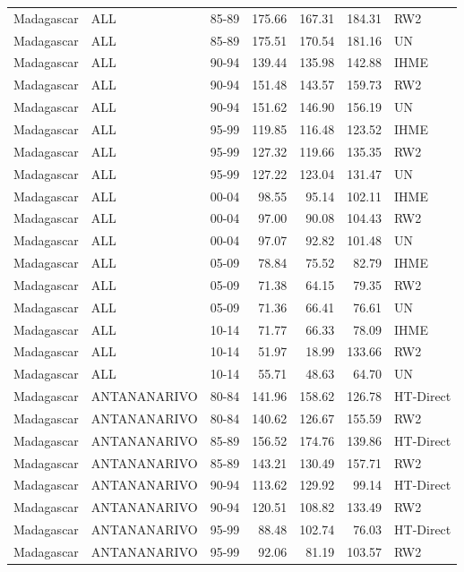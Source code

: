 \begin{longtable}{lllrrrl}
  Madagascar & ALL & 85-89 & 175.66 & 167.31 & 184.31 & RW2 \\ 
  Madagascar & ALL & 85-89 & 175.51 & 170.54 & 181.16 & UN \\ 
  Madagascar & ALL & 90-94 & 139.44 & 135.98 & 142.88 & IHME \\ 
  Madagascar & ALL & 90-94 & 151.48 & 143.57 & 159.73 & RW2 \\ 
  Madagascar & ALL & 90-94 & 151.62 & 146.90 & 156.19 & UN \\ 
  Madagascar & ALL & 95-99 & 119.85 & 116.48 & 123.52 & IHME \\ 
  Madagascar & ALL & 95-99 & 127.32 & 119.66 & 135.35 & RW2 \\ 
  Madagascar & ALL & 95-99 & 127.22 & 123.04 & 131.47 & UN \\ 
  Madagascar & ALL & 00-04 & 98.55 & 95.14 & 102.11 & IHME \\ 
  Madagascar & ALL & 00-04 & 97.00 & 90.08 & 104.43 & RW2 \\ 
  Madagascar & ALL & 00-04 & 97.07 & 92.82 & 101.48 & UN \\ 
  Madagascar & ALL & 05-09 & 78.84 & 75.52 & 82.79 & IHME \\ 
  Madagascar & ALL & 05-09 & 71.38 & 64.15 & 79.35 & RW2 \\ 
  Madagascar & ALL & 05-09 & 71.36 & 66.41 & 76.61 & UN \\ 
  Madagascar & ALL & 10-14 & 71.77 & 66.33 & 78.09 & IHME \\ 
  Madagascar & ALL & 10-14 & 51.97 & 18.99 & 133.66 & RW2 \\ 
  Madagascar & ALL & 10-14 & 55.71 & 48.63 & 64.70 & UN \\ 
  Madagascar & ANTANANARIVO & 80-84 & 141.96 & 158.62 & 126.78 & HT-Direct \\ 
  Madagascar & ANTANANARIVO & 80-84 & 140.62 & 126.67 & 155.59 & RW2 \\ 
  Madagascar & ANTANANARIVO & 85-89 & 156.52 & 174.76 & 139.86 & HT-Direct \\ 
  Madagascar & ANTANANARIVO & 85-89 & 143.21 & 130.49 & 157.71 & RW2 \\ 
  Madagascar & ANTANANARIVO & 90-94 & 113.62 & 129.92 & 99.14 & HT-Direct \\ 
  Madagascar & ANTANANARIVO & 90-94 & 120.51 & 108.82 & 133.49 & RW2 \\ 
  Madagascar & ANTANANARIVO & 95-99 & 88.48 & 102.74 & 76.03 & HT-Direct \\ 
  Madagascar & ANTANANARIVO & 95-99 & 92.06 & 81.19 & 103.57 & RW2 \\ 

\end{longtable}

